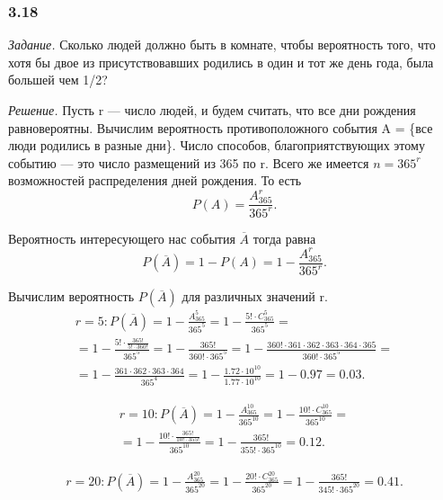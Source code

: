 \subsubsection*{3.18}

\textit{Задание.} Сколько людей должно быть в комнате, чтобы вероятность того, что хотя бы двое из присутствовавших родились в один и тот же день года, была большей чем 1/2?

\textit{Решение.} Пусть r --- число людей, и будем считать, что все дни рождения равновероятны.
Вычислим вероятность противоположного события A = \{все люди родились в разные дни\}.
Число способов, благоприятствующих этому событию --- это число размещений из 365 по r.
Всего же имеется $ n = 365^r $ возможностей распределения дней рождения.
То есть
$$ P(A) =
\frac{A_{365}^r}{365^r}.$$

Вероятность интересующего нас события $ \overline{A} $ тогда равна
$$ P \left( \overline{A} \right) =
1 - P \left( A \right) =
1 - \frac{A_{365}^r}{365^r}.$$

Вычислим вероятность $ P \left( \overline{A} \right) $ для различных значений r.
\begin{equation*}
\begin{split}
r = 5 : P \left( \overline{A} \right) =
1 - \frac{A_{365}^5}{365^5} =
1 - \frac{5! \cdot C_{365}^5}{365^5} = \\
= 1 - \frac{5! \cdot \frac{365!}{5! \cdot 360!} }{365^5} =
1 - \frac{365!}{360! \cdot 365^5} =
1 - \frac{360! \cdot 361 \cdot 362 \cdot 363 \cdot 364 \cdot 365}{360! \cdot 365^5} = \\
= 1 - \frac{361 \cdot 362 \cdot 363 \cdot 364}{365^4} =
1 - \frac{1.72 \cdot 10^10}{1.77 \cdot 10^10} =
1 - 0.97 =
0.03.
\end{split}
\end{equation*}

\begin{equation*}
\begin{split}
r = 10 :
P \left( \overline{A} \right) =
1 - \frac{A_{365}^{10}}{365^{10}} =
1- \frac{10! \cdot C_{365}^{10}}{365^{10}} = \\
= 1 - \frac{10! \cdot \frac{365!}{10! \cdot 355!}}{365^{10}} =
1 - \frac{365!}{355! \cdot 365^{10}} =
0.12.
\end{split}
\end{equation*}

\begin{equation*}
\begin{split}
r = 20 :
P \left( \overline{A} \right) =
1 - \frac{A_{365}^{20}}{365^{20}} =
1 - \frac{20! \cdot C_{365}^{20}}{365^{20}} =
1 - \frac{365!}{345! \cdot 365^{20}} =
0.41.
\end{split}
\end{equation*}

